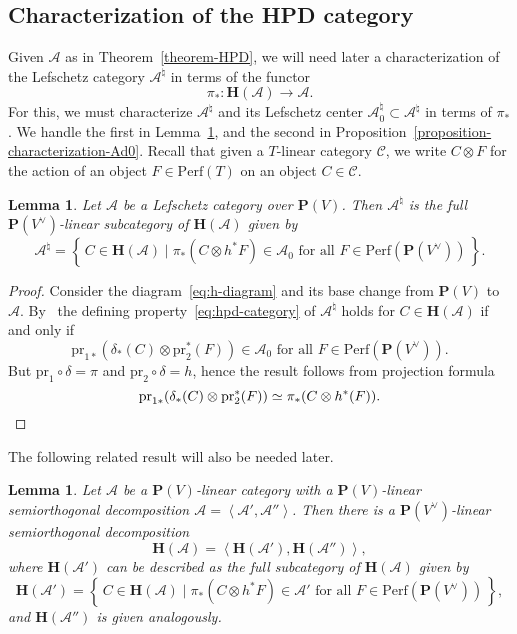 \documentclass[11pt, reqno]{amsart}
\numberwithin{equation}{section}
\theoremstyle{plain}
\newtheorem{lemma}[theorem]{Lemma}
\theoremstyle{definition}
\newcommand{\st}{\mid}
\newcommand{\set}[1]{\left\{ \, #1 \, \right\}}
\newcommand{\Perf}{\mathrm{Perf}}
\newcommand{\hpd}{{\natural}}
\newcommand{\svee}{\scriptscriptstyle\vee}
\newcommand{\cAd}{\cA^\hpd}
\newcommand{\llangle}{\left \langle}
\newcommand{\rrangle}{\right \rangle}
\newcommand{\vV}{V^{\svee}}
\newcommand{\pr}{\mathrm{pr}}
\newcommand{\cA}{\mathcal{A}}
\newcommand{\cC}{\mathcal{C}}
\newcommand{\bH}{\mathbf{H}}
\newcommand{\bP}{\mathbf{P}}
\begin{document}
\subsection{Characterization of the HPD category} 
\label{subsection-HPD-characterization} 
Given $\cA$ as in Theorem~\ref{theorem-HPD}, we will need later 
a characterization of the Lefschetz category $\cAd$ in terms of the 
functor   
\begin{equation*}
\pi_* \colon \bH(\cA) \to \cA. 
\end{equation*}
For this, we must characterize $\cAd$ and its Lefschetz center $\cAd_0 \subset \cAd$ 
in terms of $\pi_*$. We handle the first in Lemma~\ref{lemma-characterization-Cd}, and 
the second in Proposition~\ref{proposition-characterization-Ad0}. 
Recall that given a $T$-linear category $\cC$, we write $C \otimes F$ 
for the action of an object $F \in \Perf(T)$ on an object $C \in \cC$. 

\begin{lemma}
\label{lemma-characterization-Cd} 
Let $\cA$ be a Lefschetz category over $\bP(V)$. 
Then $\cAd$ is the full $\bP(\vV)$-linear subcategory of $\bH(\cA)$ given by
\begin{equation*}
\cAd = \set{ C \in \bH(\cA) \st \pi_*(C \otimes h^*F) \in \cA_0 \text{ for all } F \in \Perf(\bP(\vV))} . 
\end{equation*}
\end{lemma} 

\begin{proof}
Consider the diagram~\eqref{eq:h-diagram} and its base change from $\bP(V)$ to $\cA$.
By~\cite[Lemma 3.18]{NCHPD} the defining property~\eqref{eq:hpd-category} of $\cAd$ holds for $C \in \bH(\cA)$
if and only if 
\begin{equation*}
\pr_{1*}(\delta_*(C) \otimes \pr_2^*(F)) \in \cA_0  \text{ for all } F \in \Perf(\bP(\vV)). 
\end{equation*}
But $\pr_1 \circ \delta = \pi$ and $\pr_2 \circ \delta = h$, hence the result follows from projection formula 
\begin{equation*}
\pr_{1*}(\delta_*(C) \otimes \pr_2^*(F)) \simeq
\pi_*(C \otimes h^*(F)).\qedhere
\end{equation*}
\end{proof}

The following related result will also be needed later. 

\begin{lemma} 
\label{lemma-bH-sod}
Let $\cA$ be a $\bP(V)$-linear category with a $\bP(V)$-linear semiorthogonal 
decomposition $\cA = \llangle \cA', \cA'' \rrangle$. 
Then there is a $\bP(\vV)$-linear semiorthogonal decomposition 
\begin{equation*}
\bH(\cA) = \llangle \bH(\cA') , \bH(\cA'') \rrangle, 
\end{equation*}
where $\bH(\cA')$ can be described as the full subcategory of $\bH(\cA)$ given by 
\begin{equation*}
\bH(\cA') = \set{C \in \bH(\cA) \st \pi_*(C \otimes h^*F) \in \cA' \text{ for all } F \in \Perf(\bP(\vV))} , 
\end{equation*} 
and $\bH(\cA'')$ is given analogously. 
\end{lemma}
\end{document}
